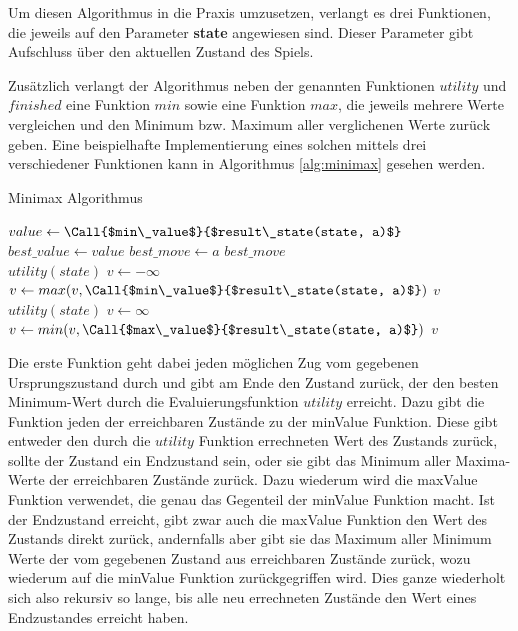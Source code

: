 
Um diesen Algorithmus in die Praxis umzusetzen, verlangt es drei Funktionen, die jeweils auf den Parameter \textbf{state} angewiesen sind. Dieser Parameter gibt Aufschluss über den aktuellen Zustand des Spiels.

Zusätzlich verlangt der Algorithmus neben der genannten Funktionen $utility$ und $finished$ eine Funktion $min$ sowie eine Funktion $max$, die jeweils mehrere Werte vergleichen und den Minimum bzw. Maximum aller verglichenen Werte zurück geben. Eine beispielhafte Implementierung eines solchen mittels drei verschiedener Funktionen kann in Algorithmus \ref{alg:minimax} gesehen werden.

\begin{algorithm}[h]
\caption{Minimax Algorithmus \cite{Russell2010}}
\label{alg:minimax}
\begin{algorithmic}
		\State $value \gets \Call{$min\_value$}{$result\_state(state, a)$}$
			\State $best\_value \gets value$
			\State $best\_move \gets a$
		\EndIf
	\EndFor
	\State \Return $best\_move$
\EndFunction
\\
	 \State \Return $utility(state)$ \EndIf
	\State $v \gets -\infty$
		\State $v \gets max(v, \Call{$min\_value$}{$result\_state(state, a)$})$
	\EndFor
	\State \Return $v$
\EndFunction
\\
	 \State \Return $utility(state)$ \EndIf
	\State $v \gets \infty$
		\State $v \gets min(v, \Call{$max\_value$}{$result\_state(state, a)$})$
	\EndFor
	\State \Return $v$
\EndFunction
\end{algorithmic}
\end{algorithm}

Die erste Funktion geht dabei jeden möglichen Zug vom gegebenen Ursprungszustand durch und gibt am Ende den Zustand zurück, der den besten Minimum-Wert durch die Evaluierungsfunktion $utility$ erreicht. Dazu gibt die Funktion jeden der erreichbaren Zustände zu der minValue Funktion. Diese gibt entweder den durch die $utility$ Funktion errechneten Wert des Zustands zurück, sollte der Zustand ein Endzustand sein, oder sie gibt das Minimum aller Maxima-Werte der erreichbaren Zustände zurück. Dazu wiederum wird die maxValue Funktion verwendet, die genau das Gegenteil der minValue Funktion macht. Ist der Endzustand erreicht, gibt zwar auch die maxValue Funktion den Wert des Zustands direkt zurück, andernfalls aber gibt sie das Maximum aller Minimum Werte der vom gegebenen Zustand aus erreichbaren Zustände zurück, wozu wiederum auf die minValue Funktion zurückgegriffen wird. Dies ganze wiederholt sich also rekursiv so lange, bis alle neu errechneten Zustände den Wert eines Endzustandes erreicht haben. \cite{Russell2010}

